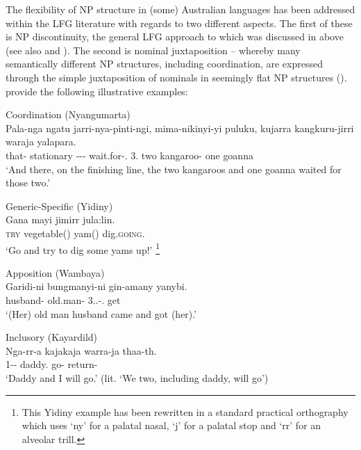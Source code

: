 \documentclass[output=paper,hidelinks]{langscibook}
\begin{document}
The flexibility of NP structure in (some) Australian languages has been addressed within the LFG literature with regards to two different aspects.  The first of these is NP discontinuity, the general LFG approach to which was discussed in  above (see also \citealt{snijders_lfg_2016} and ).  The second is nominal juxtaposition -- whereby many semantically different NP structures, including coordination, are expressed through the simple juxtaposition of nominals in seemingly flat NP structures (\citealt{SadlNord_apposition_2006,SadlNord2010}). \citet{SadlNord2010} provide the following illustrative examples:

\ea \label{nyangu-agree} Coordination (Nyangumarta)\\
\gll Pala-nga ngatu jarri-nya-pinti-ngi, mima-nikinyi-yi puluku, kujarra kangkuru-jirri waraja yalapara.\\
{that-\LOC} {stationary} {\INCH-\NMLZ-\ASSOC-\LOC} {wait.for-\PL.\SBJ} {3\DU.\DAT} {two} {kangaroo-\DU} {one} {goanna}\\
\glt `And there, on the finishing line, the two kangaroos and one goanna waited for those two.'  \citep[315]{Sharp:Nyangumarta}
\z

\newpage

\ea \label{yam} Generic-Specific (Yidiny)\\
\gll Gana mayi jimirr jula:lin.\\
\textsc{try} {vegetable(\ABS)} {yam(\ABS)} {dig.\textsc{going}.\IMP}\\
\glt `Go and try to dig some yams up!' \citep[247]{Dixon:Yidiny}\footnote{This Yidiny example has been rewritten in a standard practical orthography which uses `ny' for a palatal nasal, `j' for a palatal stop and `rr' for an alveolar trill.}
\z

\ea \label{wamb-appos} Apposition (Wambaya)\\
\gll Garidi-ni bungmanyi-ni gin-amany yanybi.\\
{husband-\ERG} {old.man-\ERG} {3\SG.\M.\SBJ-\PST.\TWD} {get}\\
\glt `(Her) old man husband came and got (her).' \citep[133]{Nordlinger:Wambaya}
\z

\ea \label{kayar-incl} Inclusory (Kayardild)\\
\gll Nga-rr-a kajakaja warra-ja thaa-th.\\
{1-\DU-\NOM} {daddy.\NOM} {go-\ACT} {return-\ACT}\\
\glt `Daddy and I will go.' (lit. `We two, including daddy, will go') \citep[249]{Evans95}
\z
 
\end{document}
